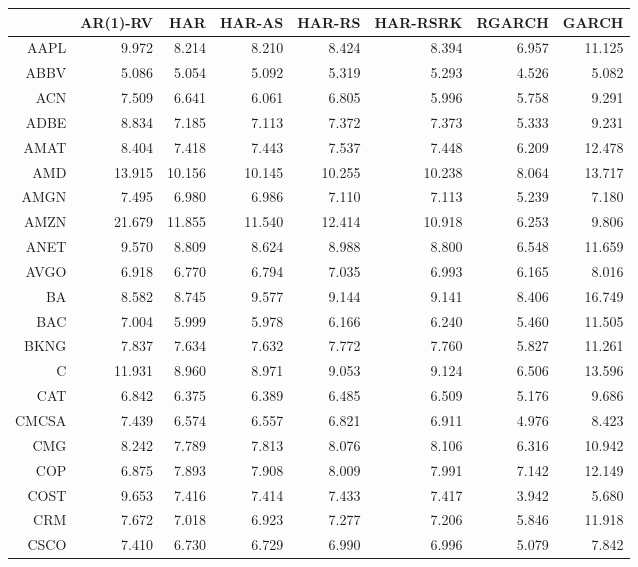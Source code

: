 \begin{table}[ht]
\centering
\begin{tabular}{rrrrrrrr}
  \hline
 & AR(1)-RV & HAR & HAR-AS & HAR-RS & HAR-RSRK & RGARCH & GARCH \\ 
  \hline
AAPL & 9.972 & 8.214 & 8.210 & 8.424 & 8.394 & 6.957 & 11.125 \\ 
  ABBV & 5.086 & 5.054 & 5.092 & 5.319 & 5.293 & 4.526 & 5.082 \\ 
  ACN & 7.509 & 6.641 & 6.061 & 6.805 & 5.996 & 5.758 & 9.291 \\ 
  ADBE & 8.834 & 7.185 & 7.113 & 7.372 & 7.373 & 5.333 & 9.231 \\ 
  AMAT & 8.404 & 7.418 & 7.443 & 7.537 & 7.448 & 6.209 & 12.478 \\ 
  AMD & 13.915 & 10.156 & 10.145 & 10.255 & 10.238 & 8.064 & 13.717 \\ 
  AMGN & 7.495 & 6.980 & 6.986 & 7.110 & 7.113 & 5.239 & 7.180 \\ 
  AMZN & 21.679 & 11.855 & 11.540 & 12.414 & 10.918 & 6.253 & 9.806 \\ 
  ANET & 9.570 & 8.809 & 8.624 & 8.988 & 8.800 & 6.548 & 11.659 \\ 
  AVGO & 6.918 & 6.770 & 6.794 & 7.035 & 6.993 & 6.165 & 8.016 \\ 
  BA & 8.582 & 8.745 & 9.577 & 9.144 & 9.141 & 8.406 & 16.749 \\ 
  BAC & 7.004 & 5.999 & 5.978 & 6.166 & 6.240 & 5.460 & 11.505 \\ 
  BKNG & 7.837 & 7.634 & 7.632 & 7.772 & 7.760 & 5.827 & 11.261 \\ 
  C & 11.931 & 8.960 & 8.971 & 9.053 & 9.124 & 6.506 & 13.596 \\ 
  CAT & 6.842 & 6.375 & 6.389 & 6.485 & 6.509 & 5.176 & 9.686 \\ 
  CMCSA & 7.439 & 6.574 & 6.557 & 6.821 & 6.911 & 4.976 & 8.423 \\ 
  CMG & 8.242 & 7.789 & 7.813 & 8.076 & 8.106 & 6.316 & 10.942 \\ 
  COP & 6.875 & 7.893 & 7.908 & 8.009 & 7.991 & 7.142 & 12.149 \\ 
  COST & 9.653 & 7.416 & 7.414 & 7.433 & 7.417 & 3.942 & 5.680 \\ 
  CRM & 7.672 & 7.018 & 6.923 & 7.277 & 7.206 & 5.846 & 11.918 \\ 
  CSCO & 7.410 & 6.730 & 6.729 & 6.990 & 6.996 & 5.079 & 7.842 \\ 

\end{tabular}
\end{table}
